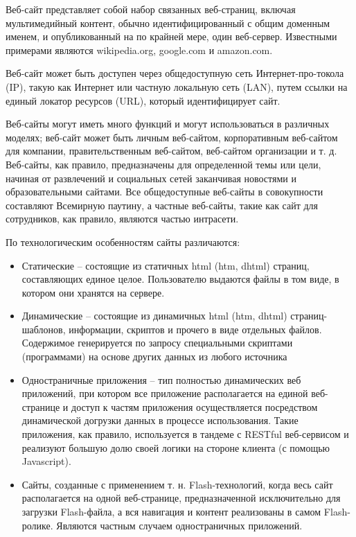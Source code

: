 Веб-сайт представляет собой набор связанных веб-страниц, включая мультимедийный контент, обычно идентифицированный с общим доменным именем, и опубликованный на
по крайней мере, один веб-сервер. Известными примерами являются wikipedia.org, google.com и amazon.com.

Веб-сайт может быть доступен через общедоступную сеть Интернет-про-токола (IP), такую как Интернет или частную локальную сеть (LAN), путем ссылки на
единый локатор ресурсов (URL), который идентифицирует сайт.

Веб-сайты могут иметь много функций и могут использоваться в различных моделях; веб-сайт может быть личным веб-сайтом, корпоративным веб-сайтом для компании, правительственным
веб-сайтом, веб-сайтом организации и т. д. Веб-сайты, как правило, предназначены для определенной темы или цели, начиная от развлечений и социальных сетей
заканчивая новостями и образовательными сайтами. Все общедоступные веб-сайты в совокупности составляют Всемирную паутину, а частные веб-сайты, такие как
сайт для сотрудников, как правило, являются частью интрасети.

По технологическим особенностям сайты различаются:

\begin{itemize}
\item Статические -- состоящие из статичных html (htm, dhtml) страниц, составляющих единое целое. Пользователю выдаются файлы в том виде, в котором они хранятся на сервере.
\item Динамические -- состоящие из динамичных html (htm, dhtml) страниц-шаблонов, информации, скриптов и прочего в виде отдельных файлов. Содержимое генерируется по запросу
специальными скриптами (программами) на основе других данных из любого источника
\item Одностраничные приложения -- тип полностью динамических веб приложений, при котором все приложение располагается на единой веб-странице и доступ к частям приложения
осуществляется посредством динамической догрузки данных в процессе использования. Такие приложения, как правило, используется в тандеме с RESTful веб-сервисом и реализуют
большую долю своей логики на стороне клиента (с помощью Javascript).
\item Сайты, созданные с применением т. н. Flash-технологий, когда весь сайт располагается на одной веб-странице, предназначенной исключительно для загрузки Flash-файла,
а вся навигация и контент реализованы в самом Flash-ролике. Являются частным случаем одностраничных приложений.
\end{itemize}

